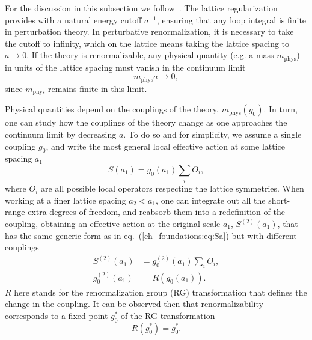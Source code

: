 For the discussion in this subsection we follow~\citep{Hernandez:2009zz}. The lattice regularization provides with a natural energy cutoff $a^{-1}$, ensuring that any loop integral is finite in perturbation theory. In perturbative renormalization, it is necessary to take the cutoff to infinity, which on the lattice means taking the lattice spacing to $a\rightarrow0$. If the theory is renormalizable, any physical quantity (e.g. a mass $m_{\textrm{phys}}$) in units of the lattice spacing must vanish in the continuum limit
\begin{equation}
\label{ch_foundation:eq:ma0}
m_{\textrm{phys}}a\rightarrow0,
\end{equation}
since $m_{\textrm{phys}}$ remains finite in this limit. 

Physical quantities depend on the couplings of the theory, $m_{\textrm{phys}}(g_0)$. In turn, one can study how the couplings of the theory change as one approaches the continuum limit by decreasing $a$. To do so and for simplicity, we assume a single coupling $g_0$, and write the most general local effective action at some lattice spacing $a_1$
\begin{equation}
\label{ch_foundations:eq:Sa}
S(a_1)=g_0(a_1)\sum_i{O}_i,
\end{equation}
where ${O}_i$ are all possible local operators respecting the lattice symmetries. When working at a finer lattice spacing $a_2<a_1$, one can integrate out all the short-range extra degrees of freedom, and reabsorb them into a redefinition of the coupling, obtaining an effective action at the original scale $a_1$, $S^{(2)}(a_1)$, that has the same generic form as in eq.~(\ref{ch_foundations:eq:Sa}) but with different couplings
\begin{align}
S^{(2)}(a_1)&=g_0^{(2)}(a_1)\sum_iO_i, \\
g_0^{(2)}(a_1)&=R(g_0(a_1)).
\end{align}
$R$ here stands for the renormalization group (RG) transformation that defines the change in the coupling. It can be observed then that renormalizability corresponds to a fixed point $g_0^*$ of the RG transformation
\begin{equation}
R(g_0^*)=g_0^*.
\end{equation}

